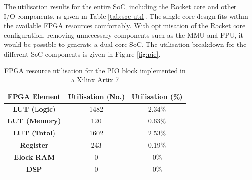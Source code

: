 The utilisation results for the entire SoC, including the Rocket core and other I/O components, is given in Table \ref{tab:soc-util}. The single-core design fits within the available FPGA resources comfortably. With optimisation of the Rocket core configuration, removing unnecessary components such as the MMU and FPU, it would be possible to generate a dual core SoC. The utilisation breakdown for the different SoC components is given in Figure \ref{fig:pie}.

\begin{table}[H]
    \centering
    \begin{tabular}{|c|c|c|}
        \hline
        \textbf{FPGA Element} & \textbf{Utilisation (No.)} & \textbf{Utilisation  (\%)} \\
        \hline
        \textbf{LUT (Logic)}  & 1482                       & 2.34\%                     \\
        \hline
        \textbf{LUT (Memory)} & 120                        & 0.63\%                     \\
        \hline
        \textbf{LUT (Total)}  & 1602                       & 2.53\%                     \\
        \hline
        \textbf{Register}     & 243                        & 0.19\%                     \\
        \hline
        \textbf{Block RAM}    & 0                          & 0\%                        \\
        \hline
        \textbf{DSP}          & 0                          & 0\%                        \\
        \hline
    \end{tabular}
    \caption{FPGA resource utilisation for the PIO block implemented in a Xilinx Artix 7}
    \label{tab:pio-util}
\end{table}


